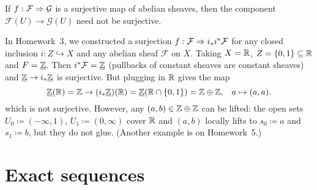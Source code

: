 
\begin{rmk}
If \(f\colon\mathcal F\To\mathcal G\) is a surjective map of abelian sheaves, then the component \(\mathcal F(U)\to\mathcal G(U)\) need not be surjective.

In Homework~3, we constructed a surjection \(f\colon\mathcal F\To i_*i^*\mathcal F\) for any closed inclusion \(i\colon Z\hookrightarrow X\) and any abelian sheaf \(\mathcal F\) on \(X\).
Taking \(X=\mathbb{R}\), \(Z = \{0,1\}\subseteq\mathbb{R}\) and \(F=\underline{\mathbb{Z}}\).
Then \(i^*\mathcal F = \underline{\mathbb{Z}}\) (pullbacks of constant sheaves are constant sheaves) and \(\underline{\mathbb{Z}}\to i_*\underline{\mathbb{Z}}\) is surjective.
But plugging in \(\mathbb{R}\) gives the map
\[\underline{\mathbb{Z}}(\mathbb{R}) = \mathbb{Z} \to (i_*\underline{\mathbb{Z}})(\mathbb{R}) = \underline{\mathbb{Z}}(\mathbb{R}\cap\{0,1\}) = \mathbb{Z}\oplus\mathbb{Z}\text{,} \quad a \mapsto (a,a)\text{.} \]
which is not surjective.
However, any \((a,b)\in\mathbb{Z}\oplus\mathbb{Z}\) can be lifted: the open sets \(U_0\coloneq(-\infty,1)\), \(U_1\coloneq(0,\infty)\) cover \(\mathbb{R}\) and \((a,b)\) locally lifts to \(s_0\coloneq a\) and \(s_1\coloneq b\), but they do not glue.
(Another example is on Homework~5.)
\end{rmk}

\section{Exact sequences}

